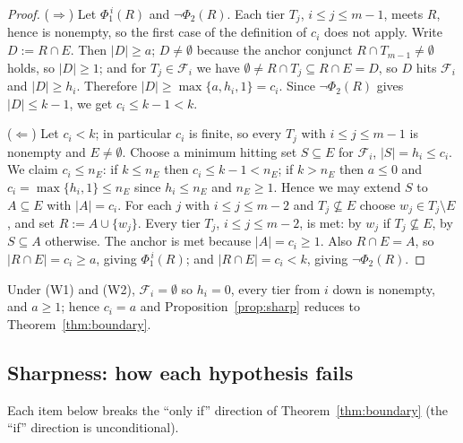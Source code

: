 \begin{proof}
($\Rightarrow$) Let $\Phi_1^{\,i}(R)$ and $\neg\Phi_2(R)$.  Each tier
$T_j$, $i\le j\le m-1$, meets $R$, hence is nonempty, so the first case of
the definition of $c_i$ does not apply.  Write $D:=R\cap E$.  Then
$|D|\ge a$; $D\neq\emptyset$ because the anchor conjunct $R\cap T_{m-1}
\neq\emptyset$ holds, so $|D|\ge1$; and for $T_j\in\mathcal F_i$ we have
$\emptyset\neq R\cap T_j\subseteq R\cap E=D$, so $D$ hits $\mathcal F_i$ and
$|D|\ge h_i$.  Therefore $|D|\ge\max\{a,h_i,1\}=c_i$.  Since
$\neg\Phi_2(R)$ gives $|D|\le k-1$, we get $c_i\le k-1<k$.

($\Leftarrow$) Let $c_i<k$; in particular $c_i$ is finite, so every $T_j$
with $i\le j\le m-1$ is nonempty and $E\neq\emptyset$.  Choose a minimum
hitting set $S\subseteq E$ for $\mathcal F_i$, $|S|=h_i\le c_i$.  We claim
$c_i\le n_E$: if $k\le n_E$ then $c_i\le k-1<n_E$; if $k>n_E$ then $a\le 0$
and $c_i=\max\{h_i,1\}\le n_E$ since $h_i\le n_E$ and $n_E\ge1$.  Hence we may
extend $S$ to $A\subseteq E$ with $|A|=c_i$.  For each $j$ with
$i\le j\le m-2$ and $T_j\not\subseteq E$ choose $w_j\in T_j\setminus E$, and
set $R:=A\cup\{w_j\}$.  Every tier $T_j$, $i\le j\le m-2$, is met: by $w_j$ if
$T_j\not\subseteq E$, by $S\subseteq A$ otherwise.  The anchor is met because
$|A|=c_i\ge1$.  Also $R\cap E=A$, so $|R\cap E|=c_i\ge a$, giving
$\Phi_1^{\,i}(R)$; and $|R\cap E|=c_i<k$, giving $\neg\Phi_2(R)$.
\end{proof}

\begin{corollary}
Under (W1) and (W2), $\mathcal F_i=\emptyset$ so $h_i=0$, every tier from $i$
down is nonempty, and $a\ge1$; hence $c_i=a$ and
Proposition~\ref{prop:sharp} reduces to Theorem~\ref{thm:boundary}.
\end{corollary}

\subsection{Sharpness: how each hypothesis fails}
\label{sec:cx}

Each item below breaks the ``only if'' direction of
Theorem~\ref{thm:boundary} (the ``if'' direction is unconditional).

